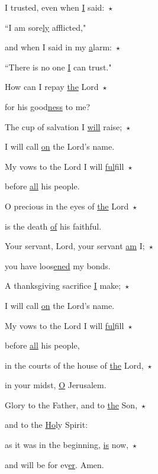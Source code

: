 \noindent I trusted, even when \uline{I} said:~$\star$~\nopagebreak

``I am sore\uline{ly} afflicted,"

\noindent and when I said in my \uline{a}larm:~$\star$~\nopagebreak

``There is no one \uline{I} can trust."

\noindent How can I repay \uline{the} Lord~$\star$~\nopagebreak

for his good\uline{ness} to me?

\noindent The cup of salvation I \uline{will} raise;~$\star$~\nopagebreak

I will call \uline{on} the Lord’s name.

\noindent My vows to the Lord I will \uline{ful}fill~$\star$~\nopagebreak

before \uline{all} his people.

\noindent O precious in the eyes of \uline{the} Lord~$\star$~\nopagebreak

is the death \uline{of} his faithful.

\noindent Your servant, Lord, your servant \uline{am} I;~$\star$~\nopagebreak

you have loos\uline{ened} my bonds.

\noindent A thanksgiving sacrifice \uline{I} make;~$\star$~\nopagebreak

I will call \uline{on} the Lord’s name.

\noindent My vows to the Lord I will \uline{ful}fill~$\star$~\nopagebreak

before \uline{all} his people,

\noindent in the courts of the house of \uline{the} Lord,~$\star$~\nopagebreak

in your midst, \uline{O} Jerusalem.

\noindent Glory to the Father, and to \uline{the} Son,~$\star$~\nopagebreak

and to the \uline{Ho}ly Spirit:

\noindent as it was in the beginning, \uline{is} now,~$\star$~\nopagebreak

and will be for ev\uline{er}. Amen.